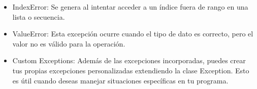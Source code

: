 \begin{itemize}
    
    \item IndexError: Se genera al intentar acceder a un índice fuera de rango en una lista o secuencia.
    \begin{figure}[h]
        \centering
      \end{figure}
    
    
    \item ValueError: Esta excepción ocurre cuando el tipo de dato es correcto, pero el valor no es válido para la operación.
    \begin{figure}[h]
        \centering
      \end{figure}
    
    \item Custom Exceptions: Además de las excepciones incorporadas, puedes crear tus propias excepciones personalizadas extendiendo la clase Exception. Esto es útil cuando deseas manejar situaciones específicas en tu programa.
    \begin{figure}[h]
        \centering
      \end{figure}
    

\end{itemize}
